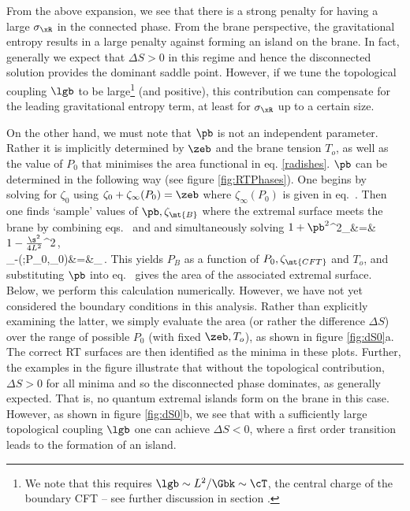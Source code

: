From the above expansion, we see that there is a strong penalty for having a large $\sigma_\xR$ in the connected phase. From the brane perspective, the gravitational entropy results in a large penalty against forming an island on the brane. In fact, generally we expect that $\Delta S>0$ in this regime and hence the disconnected solution provides the dominant saddle point. However, if we tune the topological coupling $\lgb$ to be large\footnote{We note that this requires $\lgb\sim {L^2}/{\Gbk}\sim \cT$, the central charge of the boundary CFT -- see further discussion in section .} (and positive), this contribution can compensate for the leading gravitational entropy term, at least for $\sigma_\xR$ up to a certain size.

On the other hand, we must note that $\pb$  is not an independent parameter. Rather it is implicitly determined by $\zeb$ and the brane tension $T_o$, as well as the value of $P_0$ that minimises the area functional in eq. \eqref{radishes}. $\pb$ can be determined in the following way (see figure \ref{fig:RTPhases}). One begins by solving for $\zeta_0$ using
$\zeta_0+\zeta_\infty(P_0)=\zeb$ where $\zeta_\infty(P_0)$ is given in eq.~. Then one finds `sample' values of $\pb,\zeta_\mt{B}$ where the extremal surface meets the brane by combining eqs.~ and  and simultaneously solving
\beqa
 \(1+\pb^2\)\sinh^2\!\zeta_&=&\(1-\frac{\s^2}{4L^2}\)^2\,,\nonumber\\
 \zeta_-(\pb;P_0,\zeta_0)&=&\zeta_\,.
 \label{solver3}
\eeqa
This yields $P_B$ as a function of $P_0,\zeta_{\mt{CFT}}$ and $T_o$, and substituting $\pb$ into eq.~ gives the area of the associated extremal surface. Below, we perform this calculation numerically. However, we have not yet considered the boundary conditions  in this analysis. Rather than explicitly examining the latter, we simply evaluate the area (or rather the difference $\Delta S$) over the range of possible $P_0$ (with fixed $\zeb,T_o$), as shown in figure \ref{fig:dS0}a. The correct RT surfaces are then identified as the minima in these plots. Further, the examples in the figure illustrate that without the topological contribution, $\Delta S>0$ for all minima and so the disconnected phase dominates, as generally expected. That is, no quantum extremal islands form on the brane in this case. However, as shown in figure \ref{fig:dS0}b, we see that with a sufficiently large topological coupling $\lgb$ one can achieve $\Delta S<0$, where a first order transition leads to the formation of an island. 

